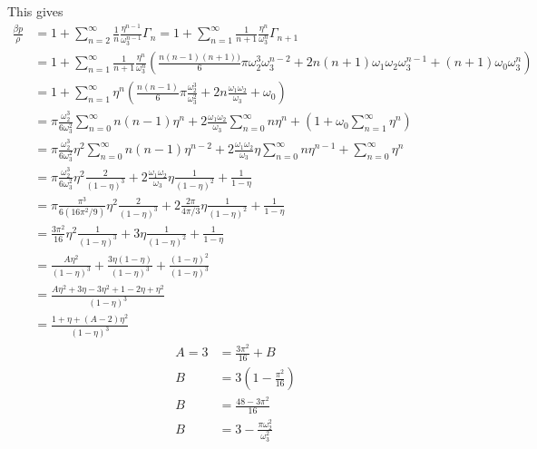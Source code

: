 \documentclass[11pt]{report}
\begin{document}
This gives
\begin{equation}
  \begin{split}
    \frac{\beta p}{\rho} &=
    1 + \sum_{n=2}^\infty \frac{1}{n} \frac{\eta^{n-1}}{\omega_3^{n-1}} \Gamma_n
    =
    1 + \sum_{n=1}^\infty \frac{1}{n+1} \frac{\eta^n}{\omega_3^n} \Gamma_{n+1}
    \\ &=
    1 + \sum_{n=1}^\infty \frac{1}{n+1} \frac{\eta^n}{\omega_3^n}
    \left(
    \frac{n(n-1)(n+1))}{6} \pi \omega_2^3 \omega_3^{n-2} +
    2 n(n+1) \omega_1 \omega_2 \omega_3^{n-1} +
    (n+1) \omega_0 \omega_3^{n}
    \right)
    \\ &=
    1 + \sum_{n=1}^\infty \eta^n
    \left(
    \frac{n(n-1)}{6} \pi \frac{\omega_2^3}{\omega_3^2} +
    2 n \frac{\omega_1 \omega_2}{\omega_3} +
    \omega_0
    \right)
    \\ &=
    \pi \frac{\omega_2^3}{6\omega_3^2}
    \sum_{n=0}^\infty
    n(n-1) \eta^n
    +
    2 \frac{\omega_1 \omega_2}{\omega_3}
    \sum_{n=0}^\infty n \eta^n
    +
    \left( 1 + \omega_0 \sum_{n=1}^\infty \eta^n \right)
    \\ &=
    \pi \frac{\omega_2^3}{6\omega_3^2}
    \eta^2
    \sum_{n=0}^\infty
    n(n-1) \eta^{n-2}
    +
    2 \frac{\omega_1 \omega_2}{\omega_3}
    \eta
    \sum_{n=0}^\infty n \eta^{n-1}
    +
    \sum_{n=0}^\infty \eta^n
    \\ &=
    \pi \frac{\omega_2^3}{6\omega_3^2}
    \eta^2
    \frac{2}{(1-\eta)^3}
    +
    2 \frac{\omega_1 \omega_2}{\omega_3}
    \eta
    \frac{1}{(1-\eta)^2}
    +
    \frac{1}{1-\eta}
    \\ &=
    \pi \frac{\pi^3}{6 (16 \pi^2 / 9)}
    \eta^2
    \frac{2}{(1-\eta)^3}
    +
    2 \frac{2 \pi}{4 \pi / 3}
    \eta
    \frac{1}{(1-\eta)^2}
    +
    \frac{1}{1-\eta}
    \\ &=
    \frac{3 \pi^2}{16}
    \eta^2
    \frac{1}{(1-\eta)^3}
    +
    3
    \eta
    \frac{1}{(1-\eta)^2}
    +
    \frac{1}{1-\eta}
    \\ &=
    \frac{A\eta^2}{(1-\eta)^3}
    +
    \frac{3\eta (1-\eta)}{(1-\eta)^3}
    +
    \frac{(1-\eta)^2}{(1-\eta)^3}
    \\ &=
    \frac{A \eta^2
    +
    3\eta - 3\eta^2
    +
    1-2\eta + \eta^2}{(1-\eta)^3}
    \\ &=
    \frac{1 + \eta + (A - 2) \eta^2}{(1-\eta)^3}
  \end{split}
\end{equation}
\begin{align*}
  A = 3 &= \frac{3\pi^2}{16} + B \\
  B &= 3\left( 1 - \frac{\pi^2}{16} \right) \\
  B &= \frac{48 - 3\pi^2}{16} \\
  B &= 3 - \frac{\pi \omega_2^2}{\omega_3^2} \\
\end{align*}
\end{document}
